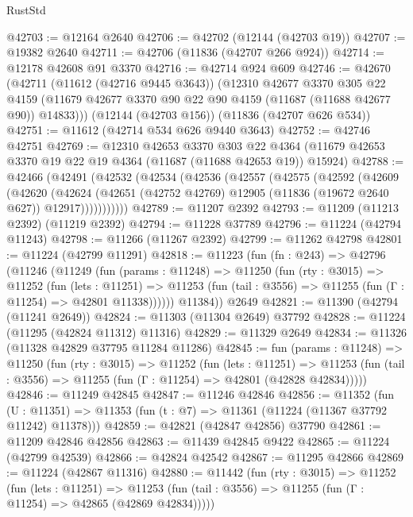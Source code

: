 \begin{lexlean}{RustStd}
\begin{coremodule}
@42703 := @12164 @2640
@42706 := @42702 (@12144 (@42703 @19))
@42707 := @19382 @2640
@42711 := @42706 (@11836 (@42707 @266 @924))
@42714 := @12178 @42608 @91 @3370
@42716 := @42714 @924 @609
@42746 := @42670
    (@42711
      (@11612 (@42716 @9445 @3643))
      (@12310
        @42677
        @3370
        @305
        @22
        @4159
        (@11679 @42677 @3370 @90 @22 @90 @4159 (@11687 (@11688 @42677 @90)) @14833)))
    (@12144 (@42703 @156))
    (@11836 (@42707 @626 @534))
@42751 := @11612 (@42714 @534 @626 @9440 @3643)
@42752 := @42746 @42751
@42769 := @12310
    @42653
    @3370
    @303
    @22
    @4364
    (@11679 @42653 @3370 @19 @22 @19 @4364 (@11687 (@11688 @42653 @19)) @15924)
@42788 := @42466
    (@42491
      (@42532
        (@42534
          (@42536
            (@42557
              (@42575
                (@42592
                  (@42609
                    (@42620
                      (@42624
                        (@42651
                          (@42752 @42769)
                          @12905
                          (@11836 (@19672 @2640 @627))
                          @12917)))))))))))
@42789 := @11207 @2392
@42793 := @11209 (@11213 @2392) (@11219 @2392)
@42794 := @11228 @37789
@42796 := @11224 (@42794 @11243)
@42798 := @11266 (@11267 @2392)
@42799 := @11262 @42798
@42801 := @11224 (@42799 @11291)
@42818 := @11223
    (fun (fn : @243) =>
    @42796
      (@11246
        (@11249
          (fun (params : @11248) =>
          @11250
            (fun (rty : @3015) =>
            @11252
              (fun (lets : @11251) =>
              @11253 (fun (tail : @3556) => @11255 (fun (Γ : @11254) => @42801 @11338))))))
        @11384))
    @2649
@42821 := @11390 (@42794 (@11241 @2649))
@42824 := @11303 (@11304 @2649) @37792
@42828 := @11224 (@11295 (@42824 @11312) @11316)
@42829 := @11329 @2649
@42834 := @11326 (@11328 @42829 @37795 @11284 @11286)
@42845 := fun (params : @11248) =>
  @11250
    (fun (rty : @3015) =>
    @11252
      (fun (lets : @11251) =>
      @11253 (fun (tail : @3556) => @11255 (fun (Γ : @11254) => @42801 (@42828 @42834)))))
@42846 := @11249 @42845
@42847 := @11246 @42846
@42856 := @11352
    (fun (U : @11351) => @11353 (fun (t : @7) => @11361 (@11224 (@11367 @37792 @11242) @11378)))
@42859 := @42821 (@42847 @42856) @37790
@42861 := @11209 @42846 @42856
@42863 := @11439 @42845 @9422
@42865 := @11224 (@42799 @42539)
@42866 := @42824 @42542
@42867 := @11295 @42866
@42869 := @11224 (@42867 @11316)
@42880 := @11442
    (fun (rty : @3015) =>
    @11252
      (fun (lets : @11251) =>
      @11253 (fun (tail : @3556) => @11255 (fun (Γ : @11254) => @42865 (@42869 @42834)))))

\end{coremodule}
\end{lexlean}
